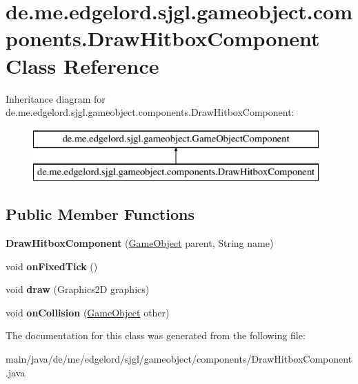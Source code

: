 \hypertarget{classde_1_1me_1_1edgelord_1_1sjgl_1_1gameobject_1_1components_1_1_draw_hitbox_component}{}\section{de.\+me.\+edgelord.\+sjgl.\+gameobject.\+components.\+Draw\+Hitbox\+Component Class Reference}
\label{classde_1_1me_1_1edgelord_1_1sjgl_1_1gameobject_1_1components_1_1_draw_hitbox_component}
Inheritance diagram for de.\+me.\+edgelord.\+sjgl.\+gameobject.\+components.\+Draw\+Hitbox\+Component\+:\begin{figure}[H]
\begin{center}
\leavevmode
\includegraphics[height=2.000000cm]{classde_1_1me_1_1edgelord_1_1sjgl_1_1gameobject_1_1components_1_1_draw_hitbox_component}
\end{center}
\end{figure}
\subsection*{Public Member Functions}
\begin{DoxyCompactItemize}
\item 
\mbox{\label{classde_1_1me_1_1edgelord_1_1sjgl_1_1gameobject_1_1components_1_1_draw_hitbox_component_aa709a1a7941030928d5e21eeb1356e79}} 
{\bfseries Draw\+Hitbox\+Component} (\mbox{\hyperlink{classde_1_1me_1_1edgelord_1_1sjgl_1_1gameobject_1_1_game_object}{Game\+Object}} parent, String name)
\item 
\mbox{\label{classde_1_1me_1_1edgelord_1_1sjgl_1_1gameobject_1_1components_1_1_draw_hitbox_component_ac68355bdf8c4b4b0fb68c6d3daf8d77b}} 
void {\bfseries on\+Fixed\+Tick} ()
\item 
\mbox{\label{classde_1_1me_1_1edgelord_1_1sjgl_1_1gameobject_1_1components_1_1_draw_hitbox_component_adf05b49a0271518e1d9601cfe08cc99b}} 
void {\bfseries draw} (Graphics2D graphics)
\item 
\mbox{\label{classde_1_1me_1_1edgelord_1_1sjgl_1_1gameobject_1_1components_1_1_draw_hitbox_component_a76114ecfa0b9badbb0d7c77b90999682}} 
void {\bfseries on\+Collision} (\mbox{\hyperlink{classde_1_1me_1_1edgelord_1_1sjgl_1_1gameobject_1_1_game_object}{Game\+Object}} other)
\end{DoxyCompactItemize}


The documentation for this class was generated from the following file\+:\begin{DoxyCompactItemize}
\item 
main/java/de/me/edgelord/sjgl/gameobject/components/Draw\+Hitbox\+Component.\+java\end{DoxyCompactItemize}
